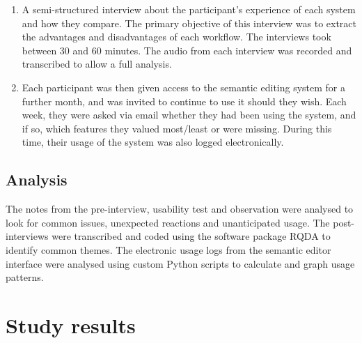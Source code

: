 \begin{enumerate}
  \item A semi-structured interview about the participant's experience of each
    system and how they compare. The primary objective of this interview was to
    extract the advantages and disadvantages of each workflow. The interviews
    took between 30 and 60 minutes. The audio from each interview was recorded
    and transcribed to allow a full analysis.


  \item Each participant was then given access to the semantic editing system
    for a further month, and was invited to continue to use it should they
    wish. Each week, they were asked via email whether they had been using the
    system, and if so, which features they valued most/least or were missing.
    During this time, their usage of the system was also logged electronically.
\end{enumerate}

\subsection{Analysis}
The notes from the pre-interview, usability test and observation were analysed
to look for common issues, unexpected reactions and unanticipated usage. The
post-interviews were transcribed and coded using the software package RQDA
\cite{RQDA} to identify common themes. The electronic usage logs from the
semantic editor interface were analysed using custom Python scripts to
calculate and graph usage patterns.

\section{Study results}



